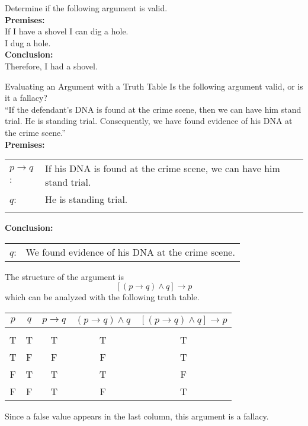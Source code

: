 \begin{try}
Determine if the following argument is valid.\\

\textbf{Premises:}\\
If I have a shovel I can dig a hole.\\
I dug a hole.\\

\textbf{Conclusion:}\\
Therefore, I had a shovel.
\end{try}
\vfill
\pagebreak

\begin{example}[https://www.youtube.com/watch?v=pCnvn2-nENk]{Evaluating an Argument with a Truth Table}
Is the following argument valid, or is it a fallacy?\\

``If the defendant's DNA is found at the crime scene, then we can have him stand trial.  He is standing trial.  Consequently, we have found evidence of his DNA at the crime scene.''\\

\textbf{Premises:}\\
\begin{tabular}{l l}
$p \to q$: & If his DNA is found at the crime scene, we can have him stand trial.\\
$q$: & He is standing trial.\\
& \\
\end{tabular}

\textbf{Conclusion:}\\
\begin{tabular}{l l}
$q$: & We found evidence of his DNA at the crime scene.
\end{tabular}

The structure of the argument is \[[(p \to q) \wedge q] \to p\]
which can be analyzed with the following truth table.
\begin{center}
\begin{tabular}{|c c c c c|}
\hline
$p$ & $q$ & $p \to q$ & $(p \to q) \wedge q$ & $[(p \to q) \wedge q] \to p$\\
\hline
& & & & \\
T & T & T & T & T\\
T & F & F & F & T\\
F & T & T & T & F\\
F & F & T & F & T\\
\hline
\end{tabular}
\end{center}

Since a false value appears in the last column, this argument is a fallacy.
\end{example}

